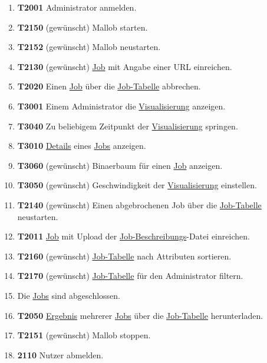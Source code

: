 \begin{enumerate}
    \item \textbf{T2001} \gls{Administrator} anmelden.
    
    \item \textbf{T2150} (gewünscht) \gls{Mallob} starten. 
    
    \item \textbf{T2152} (gewünscht) \gls{Mallob} neustarten. 
    
    \item \textbf{T2130} (gewünscht) \hyperref[B:Jobs]{Job} mit Angabe einer \gls{URL} einreichen. 
    
    \item \textbf{T2020} Einen \hyperref[B:Jobs]{Job} über die \hyperref[pages:job-table]{Job-Tabelle} abbrechen.
    
    \item \textbf{T3001} Einem \gls{Administrator} die \hyperref[pages:visualization]{Visualisierung} anzeigen.
    
    \item \textbf{T3040} Zu beliebigem Zeitpunkt der \hyperref[pages:visualization]{Visualisierung} springen.
    
    \item \textbf{T3010} \hyperref[B:Job-Details]{Details} eines \hyperref[B:Jobs]{Jobs} anzeigen.
    \item \textbf{T3060} (gewünscht) \gls{Binaerbaum} für einen \hyperref[B:Jobs]{Job} anzeigen.
    
    \item \textbf{T3050} (gewünscht) Geschwindigkeit der \hyperref[pages:visualization]{Visualisierung} einstellen.
    
    \item \textbf{T2140} (gewünscht) Einen abgebrochenen Job über die \hyperref[pages:job-table]{Job-Tabelle} neustarten.
    
    \item \textbf{T2011} \hyperref[B:Jobs]{Job} mit Upload der \hyperref[B:Job-Beschreibung]{Job-Beschreibungs}-Datei einreichen.
    
    \item \textbf{T2160} (gewünscht) \hyperref[pages:job-table]{Job-Tabelle} nach Attributen sortieren. 
    
    \item \textbf{T2170} (gewünscht) \hyperref[pages:job-table]{Job-Tabelle} für den \gls{Administrator} filtern. 
    
    \item Die  \hyperref[B:Jobs]{Jobs} sind abgeschlossen.
    
    \item \textbf{T2050} \hyperref[B:Job-Ergebnis]{Ergebnis} mehrerer  \hyperref[B:Jobs]{Jobs} über die \hyperref[pages:job-table]{Job-Tabelle} herunterladen. 
    
    \item \textbf{T2151} (gewünscht) \gls{Mallob} stoppen. 
    
    \item \textbf{2110} \gls{Nutzer} abmelden. 
\end{enumerate}






	